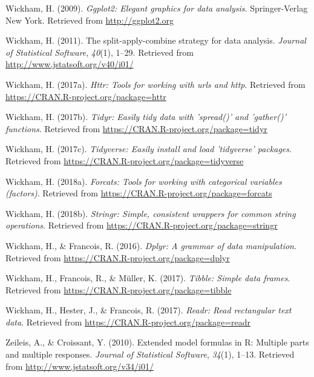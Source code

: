 \documentclass[english,man]{apa6}
\theoremstyle{definition}
\theoremstyle{definition}
\theoremstyle{definition}
\theoremstyle{remark}
\begin{document}
\hypertarget{ref-R-ggplot2}{}
Wickham, H. (2009). \emph{Ggplot2: Elegant graphics for data analysis}.
Springer-Verlag New York. Retrieved from \url{http://ggplot2.org}

\hypertarget{ref-R-plyr}{}
Wickham, H. (2011). The split-apply-combine strategy for data analysis.
\emph{Journal of Statistical Software}, \emph{40}(1), 1--29. Retrieved
from \url{http://www.jstatsoft.org/v40/i01/}

\hypertarget{ref-R-httr}{}
Wickham, H. (2017a). \emph{Httr: Tools for working with urls and http}.
Retrieved from \url{https://CRAN.R-project.org/package=httr}

\hypertarget{ref-R-tidyr}{}
Wickham, H. (2017b). \emph{Tidyr: Easily tidy data with 'spread()' and
'gather()' functions}. Retrieved from
\url{https://CRAN.R-project.org/package=tidyr}

\hypertarget{ref-R-tidyverse}{}
Wickham, H. (2017c). \emph{Tidyverse: Easily install and load
'tidyverse' packages}. Retrieved from
\url{https://CRAN.R-project.org/package=tidyverse}

\hypertarget{ref-R-forcats}{}
Wickham, H. (2018a). \emph{Forcats: Tools for working with categorical
variables (factors)}. Retrieved from
\url{https://CRAN.R-project.org/package=forcats}

\hypertarget{ref-R-stringr}{}
Wickham, H. (2018b). \emph{Stringr: Simple, consistent wrappers for
common string operations}. Retrieved from
\url{https://CRAN.R-project.org/package=stringr}

\hypertarget{ref-R-dplyr}{}
Wickham, H., \& Francois, R. (2016). \emph{Dplyr: A grammar of data
manipulation}. Retrieved from
\url{https://CRAN.R-project.org/package=dplyr}

\hypertarget{ref-R-tibble}{}
Wickham, H., Francois, R., \& Müller, K. (2017). \emph{Tibble: Simple
data frames}. Retrieved from
\url{https://CRAN.R-project.org/package=tibble}

\hypertarget{ref-R-readr}{}
Wickham, H., Hester, J., \& Francois, R. (2017). \emph{Readr: Read
rectangular text data}. Retrieved from
\url{https://CRAN.R-project.org/package=readr}

\hypertarget{ref-R-Formula}{}
Zeileis, A., \& Croissant, Y. (2010). Extended model formulas in R:
Multiple parts and multiple responses. \emph{Journal of Statistical
Software}, \emph{34}(1), 1--13. Retrieved from
\url{http://www.jstatsoft.org/v34/i01/}
\end{document}
